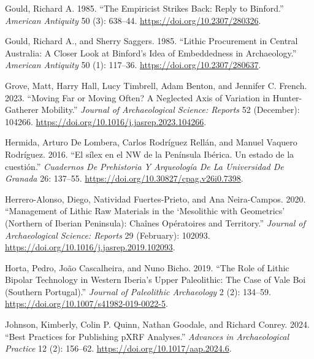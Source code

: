 \documentclass[
  a4paper,
  DIV=11,
  numbers=noendperiod]{scrreprt}
\newlength{\cslhangindent}
\newenvironment{CSLReferences}[2] %
 {\begin{list}{}{%
  \setlength{\itemindent}{0pt}
  \setlength{\leftmargin}{0pt}
  \setlength{\parsep}{0pt}
  \ifodd #1
   \setlength{\leftmargin}{\cslhangindent}
   \setlength{\itemindent}{-1\cslhangindent}
  \fi
  \setlength{\itemsep}{#2\baselineskip}}}
 {\end{list}}
\begin{document}
\begin{CSLReferences}{1}{0}
Gould, Richard A. 1985. {``The {Empiricist Strikes Back}: {Reply} to
{Binford}.''} \emph{American Antiquity} 50 (3): 638--44.
\url{https://doi.org/10.2307/280326}.

Gould, Richard A., and Sherry Saggers. 1985. {``Lithic {Procurement} in
{Central Australia}: {A Closer Look} at {Binford}'s {Idea} of
{Embeddedness} in {Archaeology}.''} \emph{American Antiquity} 50 (1):
117--36. \url{https://doi.org/10.2307/280637}.

Grove, Matt, Harry Hall, Lucy Timbrell, Adam Benton, and Jennifer C.
French. 2023. {``Moving Far or Moving Often? {A} Neglected Axis of
Variation in Hunter-Gatherer Mobility.''} \emph{Journal of
Archaeological Science: Reports} 52 (December): 104266.
\url{https://doi.org/10.1016/j.jasrep.2023.104266}.

Hermida, Arturo De Lombera, Carlos Rodríguez Rellán, and Manuel Vaquero
Rodríguez. 2016. {``{El s{í}lex en el NW de la Pen{í}nsula Ib{é}rica. Un
estado de la cuesti{ó}n}.''} \emph{Cuadernos De Prehistoria Y
Arqueolog{í}a De La Universidad De Granada} 26: 137--55.
\url{https://doi.org/10.30827/cpag.v26i0.7398}.

Herrero-Alonso, Diego, Natividad Fuertes-Prieto, and Ana Neira-Campos.
2020. {``Management of Lithic Raw Materials in the {`{Mesolithic} with
Geometrics'} ({Northern} of {Iberian Peninsula}): Cha{î}nes
Op{é}ratoires and Territory.''} \emph{Journal of Archaeological Science:
Reports} 29 (February): 102093.
\url{https://doi.org/10.1016/j.jasrep.2019.102093}.

Horta, Pedro, João Cascalheira, and Nuno Bicho. 2019. {``The {Role} of
{Lithic Bipolar Technology} in {Western Iberia}'s {Upper Paleolithic}:
The {Case} of {Vale Boi} ({Southern Portugal}).''} \emph{Journal of
Paleolithic Archaeology} 2 (2): 134--59.
\url{https://doi.org/10.1007/s41982-019-0022-5}.

Johnson, Kimberly, Colin P. Quinn, Nathan Goodale, and Richard Conrey.
2024. {``Best {Practices} for {Publishing pXRF Analyses}.''}
\emph{Advances in Archaeological Practice} 12 (2): 156--62.
\url{https://doi.org/10.1017/aap.2024.6}.


\end{CSLReferences}
\end{document}
